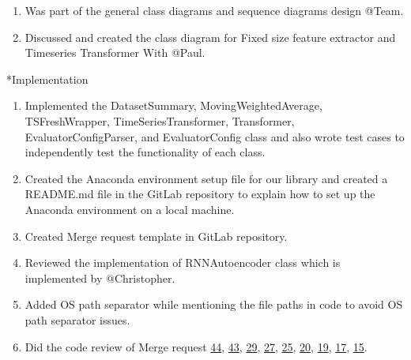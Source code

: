 \documentclass[11pt,a4paper]{article}
\begin{document}
\begin{section}
\begin{subsection}
\begin{enumerate}
         \item Was part of the general class diagrams and sequence diagrams design @Team.
         \item Discussed and created the class diagram for Fixed size feature extractor and Timeseries Transformer With @Paul.
     \end{enumerate}
 \end{subsection}
 \begin{subsection}*{Implementation}
     \begin{enumerate}
         \item Implemented the DatasetSummary, MovingWeightedAverage, TSFreshWrapper, TimeSeriesTransformer, Transformer, EvaluatorConfigParser, and EvaluatorConfig class and also wrote test cases to independently test the functionality of each class.
         \item Created the Anaconda environment setup file for our library and created a README.md file in the GitLab repository to explain how to set up the Anaconda environment on a local machine.
         \item Created Merge request template in GitLab repository.
         \item Reviewed the implementation of RNNAutoencoder class which is implemented by @Christopher.
         \item Added OS path separator while mentioning the file paths in code to avoid OS path separator issues.
         \item Did the code review of Merge request \href{https://git.cs.uni-paderborn.de/machine-learning-for-predictive-maintenance/code/-/merge_requests/44}{44}, \href{https://git.cs.uni-paderborn.de/machine-learning-for-predictive-maintenance/code/-/merge_requests/43}{43}, \href{https://git.cs.uni-paderborn.de/machine-learning-for-predictive-maintenance/code/-/merge_requests/29}{29}, \href{https://git.cs.uni-paderborn.de/machine-learning-for-predictive-maintenance/code/-/merge_requests/27}{27}, \href{https://git.cs.uni-paderborn.de/machine-learning-for-predictive-maintenance/code/-/merge_requests/25}{25}, \href{https://git.cs.uni-paderborn.de/machine-learning-for-predictive-maintenance/code/-/merge_requests/20}{20}, \href{https://git.cs.uni-paderborn.de/machine-learning-for-predictive-maintenance/code/-/merge_requests/19}{19}, \href{https://git.cs.uni-paderborn.de/machine-learning-for-predictive-maintenance/code/-/merge_requests/17}{17}, \href{https://git.cs.uni-paderborn.de/machine-learning-for-predictive-maintenance/code/-/merge_requests/15}{15}.

\end{enumerate}
\end{subsection}
\end{section}
\end{document}
